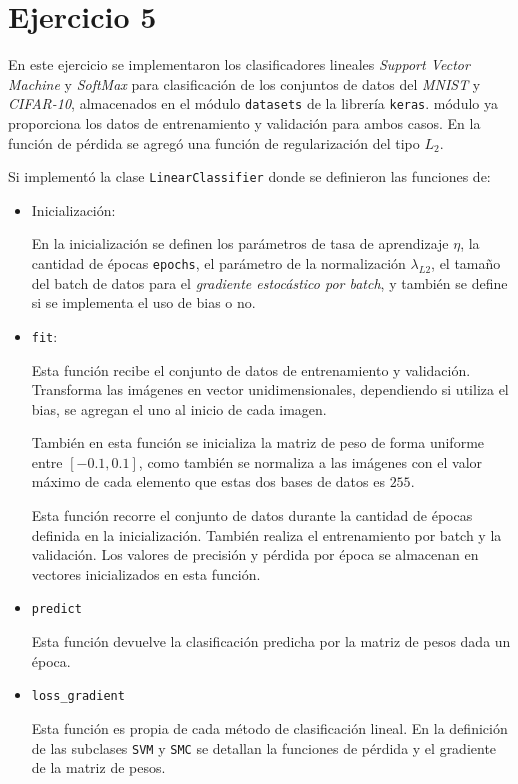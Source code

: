 \section*{Ejercicio 5}

En este ejercicio se implementaron los clasificadores lineales \emph{Support Vector Machine} y \emph{SoftMax} para clasificación de los conjuntos de datos del \emph{MNIST} y \emph{CIFAR-10}, almacenados en el módulo \verb|datasets| de la librería \verb|keras|.  módulo ya proporciona los datos de entrenamiento y validación para ambos casos. En la función de pérdida se agregó una función de regularización del tipo $L_2$.

Si implementó la clase \verb|LinearClassifier| donde se definieron las funciones de:
\begin{itemize}
    \item Inicialización:

    En la inicialización se definen los parámetros de tasa de aprendizaje  $\eta$, la cantidad de épocas \verb|epochs|, el parámetro de la normalización $\lambda_{L2}$, el tamaño del batch de datos  para el \emph{gradiente estocástico por batch}, y también se  define si se implementa el uso de bias o no.

    \item  \verb|fit|:

    Esta función recibe el conjunto de datos de entrenamiento y validación. Transforma las imágenes en vector unidimensionales, dependiendo si utiliza el bias, se agregan el uno al inicio de cada imagen.

    También en esta función se inicializa la matriz  de peso de forma uniforme entre $[-0.1, 0.1]$, como también se normaliza a las imágenes con el valor máximo de cada elemento que estas dos bases de datos es $255$.

    Esta función recorre el conjunto de datos durante la cantidad de épocas definida en la inicialización. También realiza el entrenamiento por batch y la validación. Los valores de precisión y pérdida por época se almacenan en vectores inicializados en esta función.

    \item \verb|predict|

    Esta función devuelve la clasificación predicha por la matriz de pesos dada un época.

    \item \verb|loss_gradient|

    Esta función es propia de cada método de clasificación lineal. En la definición de las subclases \verb|SVM| y \verb|SMC| se detallan la funciones de pérdida y el gradiente de la matriz de pesos.
\end{itemize}

